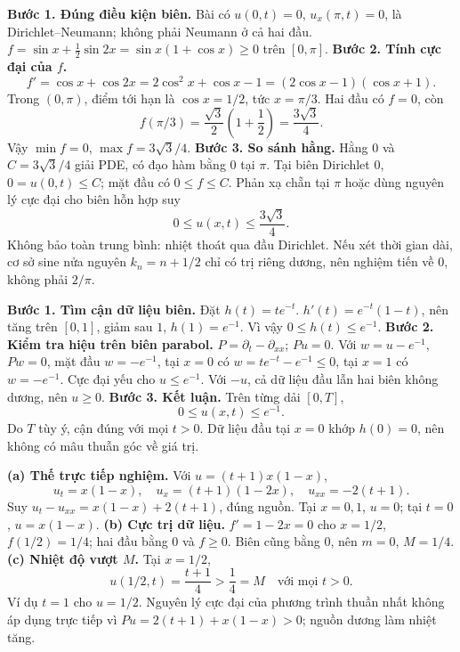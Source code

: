 \textbf{Bước 1. Đúng điều kiện biên.} Bài có $u(0,t)=0$, $u_x(\pi,t)=0$, là Dirichlet–Neumann; không phải Neumann ở cả hai đầu. $f=\sin x+\frac12\sin2x=\sin x(1+\cos x)\ge0$ trên $[0,\pi]$.
\textbf{Bước 2. Tính cực đại của $f$.}
\[f'=\cos x+\cos2x=2\cos^2x+\cos x-1
=(2\cos x-1)(\cos x+1).\]
Trong $(0,\pi)$, điểm tới hạn là $\cos x=1/2$, tức $x=\pi/3$. Hai đầu có $f=0$, còn
\[f(\pi/3)=\frac{\sqrt3}2\left(1+\frac12\right)=\frac{3\sqrt3}4.\]
Vậy $\min f=0$, $\max f=3\sqrt3/4$.
\textbf{Bước 3. So sánh hằng.} Hằng $0$ và $C=3\sqrt3/4$ giải PDE, có đạo hàm bằng $0$ tại $\pi$. Tại biên Dirichlet $0$, $0=u(0,t)\le C$; mặt đầu có $0\le f\le C$. Phản xạ chẵn tại $\pi$ hoặc dùng nguyên lý cực đại cho biên hỗn hợp suy
\[0\le u(x,t)\le\frac{3\sqrt3}4.\]
Không bảo toàn trung bình: nhiệt thoát qua đầu Dirichlet. Nếu xét thời gian dài, cơ sở sine nửa nguyên $k_n=n+1/2$ chỉ có trị riêng dương, nên nghiệm tiến về $0$, không phải $2/\pi$.

\textbf{Bước 1. Tìm cận dữ liệu biên.} Đặt $h(t)=te^{-t}$. $h'(t)=e^{-t}(1-t)$, nên tăng trên $[0,1]$, giảm sau $1$, $h(1)=e^{-1}$. Vì vậy $0\le h(t)\le e^{-1}$.
\textbf{Bước 2. Kiểm tra hiệu trên biên parabol.} $P=\partial_t-\partial_{xx}$; $Pu=0$. Với $w=u-e^{-1}$, $Pw=0$, mặt đầu $w=-e^{-1}$, tại $x=0$ có $w=te^{-t}-e^{-1}\le0$, tại $x=1$ có $w=-e^{-1}$. Cực đại yếu cho $u\le e^{-1}$. Với $-u$, cả dữ liệu đầu lẫn hai biên không dương, nên $u\ge0$.
\textbf{Bước 3. Kết luận.} Trên từng dải $[0,T]$,
\[0\le u(x,t)\le e^{-1}.\]
Do $T$ tùy ý, cận đúng với mọi $t>0$. Dữ liệu đầu tại $x=0$ khớp $h(0)=0$, nên không có mâu thuẫn góc về giá trị.

\textbf{(a) Thế trực tiếp nghiệm.} Với $u=(t+1)x(1-x)$,
\[u_t=x(1-x),\quad u_x=(t+1)(1-2x),\quad u_{xx}=-2(t+1).\]
Suy $u_t-u_{xx}=x(1-x)+2(t+1)$, đúng nguồn. Tại $x=0,1$, $u=0$; tại $t=0$, $u=x(1-x)$.
\textbf{(b) Cực trị dữ liệu.} $f'=1-2x=0$ cho $x=1/2$, $f(1/2)=1/4$; hai đầu bằng $0$ và $f\ge0$. Biên cũng bằng $0$, nên $m=0$, $M=1/4$.
\textbf{(c) Nhiệt độ vượt $M$.} Tại $x=1/2$,
\[u(1/2,t)=\frac{t+1}4>\frac14=M\quad\text{với mọi }t>0.\]
Ví dụ $t=1$ cho $u=1/2$. Nguyên lý cực đại của phương trình thuần nhất không áp dụng trực tiếp vì $Pu=2(t+1)+x(1-x)>0$; nguồn dương làm nhiệt tăng.

